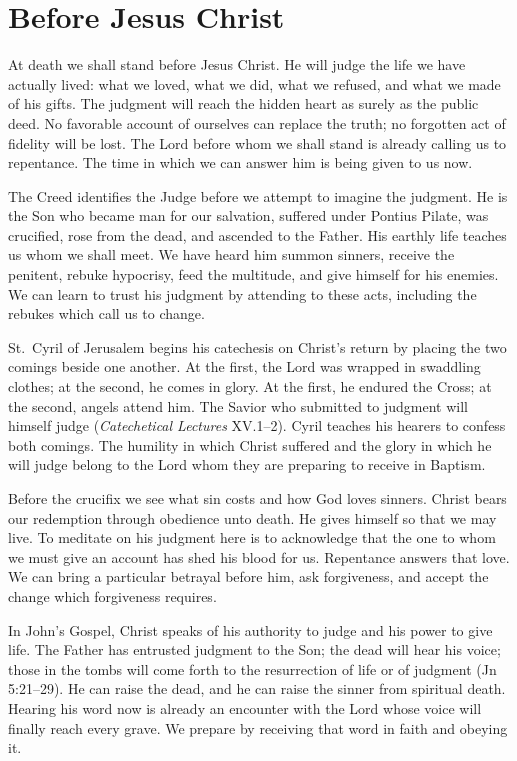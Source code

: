 \section{Before Jesus Christ}

At death we shall stand before Jesus Christ. He will judge the life we have actually lived: what we loved, what we did, what we refused, and what we made of his gifts. The judgment will reach the hidden heart as surely as the public deed. No favorable account of ourselves can replace the truth; no forgotten act of fidelity will be lost. The Lord before whom we shall stand is already calling us to repentance. The time in which we can answer him is being given to us now.

The Creed identifies the Judge before we attempt to imagine the judgment. He is the Son who became man for our salvation, suffered under Pontius Pilate, was crucified, rose from the dead, and ascended to the Father. His earthly life teaches us whom we shall meet. We have heard him summon sinners, receive the penitent, rebuke hypocrisy, feed the multitude, and give himself for his enemies. We can learn to trust his judgment by attending to these acts, including the rebukes which call us to change.

St.~Cyril of Jerusalem begins his catechesis on Christ's return by placing the two comings beside one another. At the first, the Lord was wrapped in swaddling clothes; at the second, he comes in glory. At the first, he endured the Cross; at the second, angels attend him. The Savior who submitted to judgment will himself judge (\emph{Catechetical Lectures} XV.1--2). Cyril teaches his hearers to confess both comings. The humility in which Christ suffered and the glory in which he will judge belong to the Lord whom they are preparing to receive in Baptism.

Before the crucifix we see what sin costs and how God loves sinners. Christ bears our redemption through obedience unto death. He gives himself so that we may live. To meditate on his judgment here is to acknowledge that the one to whom we must give an account has shed his blood for us. Repentance answers that love. We can bring a particular betrayal before him, ask forgiveness, and accept the change which forgiveness requires.

In John's Gospel, Christ speaks of his authority to judge and his power to give life. The Father has entrusted judgment to the Son; the dead will hear his voice; those in the tombs will come forth to the resurrection of life or of judgment (Jn 5:21--29). He can raise the dead, and he can raise the sinner from spiritual death. Hearing his word now is already an encounter with the Lord whose voice will finally reach every grave. We prepare by receiving that word in faith and obeying it.

